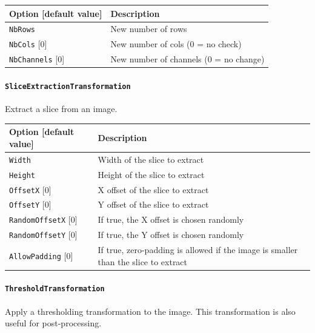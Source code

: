 \documentclass[a4paper,11pt,oneside]{article}
\newcommand{\iponly}{\reversemarginpar
    \marginnote{\color{listletiblue}\normalfont\scriptsize
    {\ttfamily{}\hyperref[sec:N2D2-IP]{\color{listletiblue}N2D2 IP}} \emph{only}}}
\begin{document}
\begin{center}
 \begin{tabular}{| p{5cm} | p{10cm} | }
 \hline
 Option [default value] & Description\\
 \hline\hline
  \cellcolor{requiredcolor}\lstinline!NbRows! & New number of rows \\
  \lstinline!NbCols! [0] & New number of cols (0 = no check) \\
  \lstinline!NbChannels! [0] & New number of channels (0 = no change) \\
 \hline
\end{tabular}
\end{center}

\paragraph{\texorpdfstring{%
\lstinline[basicstyle=\ttfamily\bfseries]!SliceExtractionTransformation!%
\protect\iponly}{SliceExtractionTransformation}}
Extract a slice from an image.

\begin{center}
 \begin{tabular}{| p{5cm} | p{10cm} | }
 \hline
 Option [default value] & Description\\
 \hline\hline
  \cellcolor{requiredcolor}\lstinline!Width! & Width of the slice to extract \\
  \cellcolor{requiredcolor}\lstinline!Height! & Height of the slice to
  extract \\
  \lstinline!OffsetX! [0] & X offset of the slice to extract \\
  \lstinline!OffsetY! [0] & Y offset of the slice to extract \\
  \lstinline!RandomOffsetX! [0] & If true, the X offset is chosen randomly \\
  \lstinline!RandomOffsetY! [0] & If true, the Y offset is chosen randomly \\
  \lstinline!AllowPadding! [0] & If true, zero-padding is allowed if the image
  is smaller than the slice to extract \\
 \hline
\end{tabular}
\end{center}



\paragraph{\texorpdfstring{\lstinline[basicstyle=\ttfamily\bfseries]!ThresholdTransformation!}{ThresholdTransformation}}
Apply a thresholding transformation to the image.
This transformation is also useful for post-processing.
\end{document}
